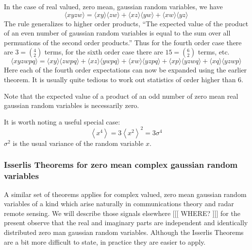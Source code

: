 In the case of real valued, zero mean, gaussian random variables, we have
\begin{equation}
\langle xyzw \rangle = 
  \langle xy \rangle \langle zw \rangle + 
  \langle xz \rangle \langle yw \rangle + 
  \langle xw \rangle \langle yz \rangle
\end{equation}
The rule generalizes to higher order products, ``The expected value of
the product of an even number of gaussian random variables is equal to
the sum over all permuations of the second order products.''  Thus for
the fourth order case there are $3 = \left({}^4_2\right)$ terms, for
the sixth order case there are $15 = \left({}^6_2\right)$ terms, etc.
\begin{equation}
\langle xyzwpq \rangle = \langle xy \rangle \langle zwpq \rangle +
 \langle xz \rangle \langle ywpq \rangle +
 \langle xw \rangle \langle yzpq \rangle +
 \langle xp \rangle \langle yzwq \rangle +
 \langle xq \rangle \langle yzwp \rangle
\end{equation}
Here each of the fourth order expectations can now be expanded using
the earlier theorem.  It is usually quite tedious to work out
statistics of order higher than 6.

Note that the expected value of a product of an odd number of zero
mean real gaussian random variables is necessarily zero.

It is worth noting a useful special case:
\begin{equation}
\left\langle x^4 \right\rangle = 3 \left\langle x^2 \right\rangle^2 =
3 \sigma^4
\end{equation}
$\sigma^2$ is the usual variance of the random variable $x$.

\subsubsection{Isserlis Theorems for zero mean complex gaussian random variables}



A similar set of theorems applies for complex valued, zero mean
gaussian random variables of a kind which arise naturally in
communications theory and radar remote sensing.  We will describe
those signals elsewhere [[[ WHERE? ]]] for the present observe that
the real and imaginary parts are independent and identically
distributed zero man gaussian random variables.  Although the Isserlis
Theorems are a bit more difficult to state, in practice they are
easier to apply.


